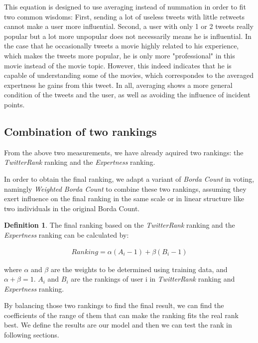 \documentclass[conference]{IEEEtran}
\theoremstyle{definition}
\newtheorem{definition}{Definition}
\begin{document}
This equation is designed to use averaging instead of nummation in order to fit two common wisdoms: First, sending a lot of useless tweets with little retweets cannot make a user more influential. Second, a user with only 1 or 2 tweets really popular but a lot more unpopular does not necessarily means he is influential. In the case that he occasionally tweets a movie highly related to his experience, which makes the tweets more popular, he is only more "professional" in this movie instead of the movie topic. However, this indeed indicates that he is capable of understanding some of the movies, which correspondes to the averaged expertness he gains from this tweet. In all, averaging shows a more general condition of the tweets and the user, as well as avoiding the influence of incident points.


\subsection{Combination of two rankings}
From the above two measurements, we have already aquired two rankings: the \textit{TwitterRank} ranking and the \textit{Expertness} ranking. 

In order to obtain the final ranking, we adapt a variant of \textit{Borda Count} in voting, namingly \textit{Weighted Borda Count} to combine these two rankings, assuming they exert influence on the final ranking in the same scale or in linear structure like two individuals in the original Borda Count.

\begin{definition}{The final ranking based on the \textit{TwitterRank} ranking and the \textit{Expertness} ranking can be calculated by:}

	\begin{align}
	Ranking = \alpha(A_i-1)+\beta(B_i-1)
	\end{align}
	
	 where $\alpha$ and $\beta$ are the weights to be determined using training data, and $\alpha + \beta = 1$. $A_i$ and $B_i$ are the rankings of user i in \textit{TwitterRank} ranking and \textit{Expertness} ranking. 
\end{definition}

By balancing those two rankings to find the final result, we can find the coefficients of the range of them that can make the ranking fits the real rank best. We define the results are our model and then we can test the rank in following sections.
\end{document}
